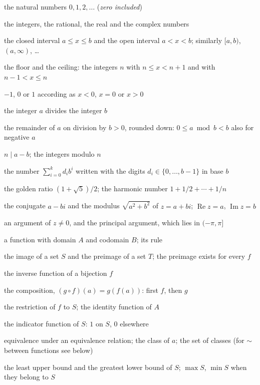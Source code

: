 \documentclass{sdbook-eng}
\begin{document}
\begin{symbols}
\item[$\mathbb N$] the natural numbers $0,1,2,\ldots$ (\emph{zero included})
\item[$\mathbb Z$, $\mathbb Q$, $\mathbb R$, $\mathbb C$] the integers, the rational, the real and the complex numbers
\item[{$[a,b]$, $(a,b)$}] the closed interval $a\le x\le b$ and the open interval $a<x<b$; similarly $[a,b)$, $(a,\infty)$, \ldots
\item[$\lfloor x\rfloor$, $\lceil x\rceil$] the floor and the ceiling: the integers $n$ with $n\le x<n+1$ and with $n-1<x\le n$
\item[$\operatorname{sign}x$] $-1$, $0$ or $1$ according as $x<0$, $x=0$ or $x>0$
\item[$a\mid b$] the integer $a$ divides the integer $b$
\item[$a\bmod b$] the remainder of $a$ on division by $b>0$, rounded down: $0\le a\bmod b<b$ also for negative $a$
\item[$a\equiv b\pmod n$, $\mathbb Z/n\mathbb Z$] $n\mid a-b$; the integers modulo $n$
\item[$(d_k\cdots d_0)_b$] the number $\sum_{i=0}^{k}d_ib^i$ written with the digits $d_i\in\{0,\ldots,b-1\}$ in base $b$
\item[$\phi$, $H_n$] the golden ratio $(1+\sqrt5)/2$; the harmonic number $1+1/2+\cdots+1/n$
\item[$\bar z$, $|z|$] the conjugate $a-bi$ and the modulus $\sqrt{a^2+b^2}$ of $z=a+bi$; $\operatorname{Re}z=a$, $\operatorname{Im}z=b$
\item[$\arg z$, $\operatorname{Arg}z$] an argument of $z\ne0$, and the principal argument, which lies in $(-\pi,\pi]$
\end{symbols}

\begin{symbols}
\item[$f\colon A\to B$, $a\mapsto f(a)$] a function with domain $A$ and codomain $B$; its rule
\item[$f(S)$, $f^{-1}(T)$] the image of a set $S$ and the preimage of a set $T$; the preimage exists for every $f$
\item[$f^{-1}$] the inverse function of a bijection $f$
\item[$g\circ f$] the composition, $(g\circ f)(a)=g(f(a))$: first $f$, then $g$
\item[$f|_S$, $\operatorname{id}_A$] the restriction of $f$ to $S$; the identity function of $A$
\item[$\mathbf 1_S$] the indicator function of $S$: $1$ on $S$, $0$ elsewhere
\item[$a\sim b$, {$[a]$}, $A/{\sim}$] equivalence under an equivalence relation; the class of $a$; the set of classes (for $\sim$ between functions see below)
\item[$\sup S$, $\inf S$] the least upper bound and the greatest lower bound of $S$; $\max S$, $\min S$ when they belong to $S$
\end{symbols}
\end{document}
